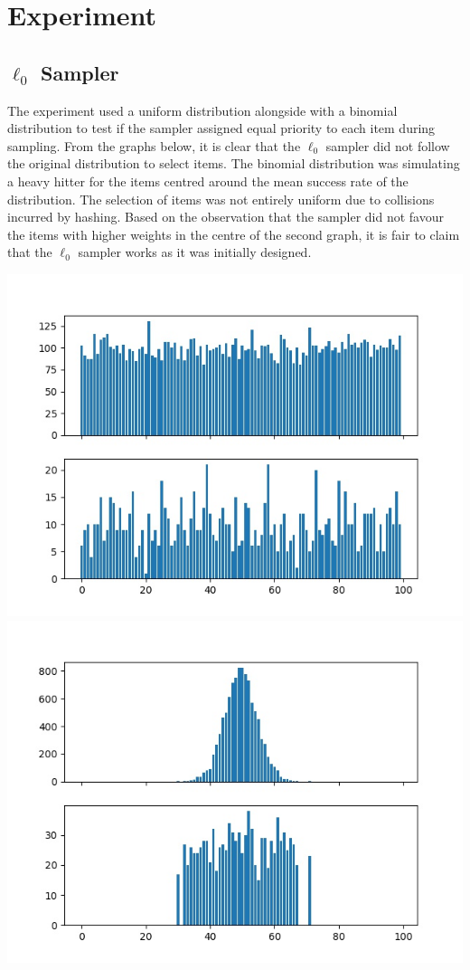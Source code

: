 \documentclass[a4paper, 11pt]{article}
\begin{document}
    \section{Experiment}
        \subsection{$\ell_{0}$ Sampler}
            The experiment used a uniform distribution alongside with a binomial distribution to test if the sampler assigned equal priority to each item during sampling. From the graphs below, it is clear that the $\ell_{0}$ sampler did not follow the original distribution to select items. The binomial distribution was simulating a heavy hitter for the items centred around the mean success rate of the distribution. The selection of items was not entirely uniform due to collisions incurred by hashing. Based on the observation that the sampler did not favour the items with higher weights in the centre of the second graph, it is fair to claim that the $\ell_{0}$ sampler works as it was initially designed.
            \begin{center}
                \includegraphics[scale=0.5]{graphs/a/1-Uniform.jpg}
                \includegraphics[scale=0.5]{graphs/a/1-Binomial.jpg}
            \end{center}
\end{document}
